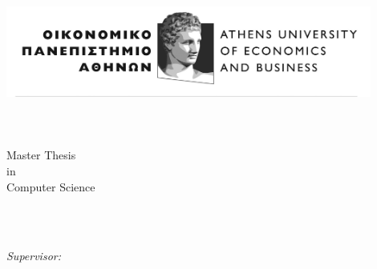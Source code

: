 %


\begin{titlepage}
	\tgherosfont
	\centering

	\includegraphics[width=12cm]{figs/aueb_logo.jpg} \\[2mm]
	\textsf{\thesisUniversityInstitute} \\
	\textsf{\thesisUniversityDepartment} \\
	\textsf{\thesisUniversityCity} \\
	\vfill
	\Large{Master Thesis} \\
	\textsf{in} \\
	\Large{Computer Science}

	\vfill

	{\LARGE \textbf{\thesisTitle} \\[4mm]}
	{\Large \thesisAuthor} \\

	\vfill
    \vfill


	\begin{minipage}[t]{.27\textwidth}
		\raggedleft
		\textit{Supervisor:}
	\end{minipage}
	\hspace*{15pt}
	\begin{minipage}[t]{.65\textwidth}
		{\Large \thesisSupervisorTitle\ \thesisSupervisor} \\
	  	{\small \thesisSupervisorDepartment} \\[-1mm]
		{\small \thesisSupervisorUniversity}
	\end{minipage} \\[15mm]


\end{titlepage}

